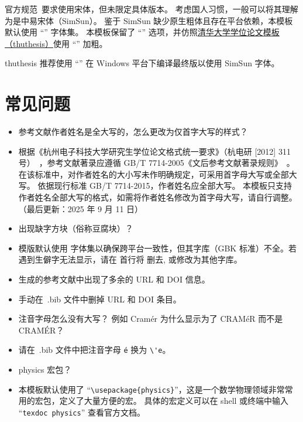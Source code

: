 官方规范~\cite{hdy2012311}要求使用宋体，但未限定具体版本。
考虑国人习惯，一般可以将其理解为是中易宋体（SimSun）。
鉴于 SimSun 缺少原生粗体且存在平台依赖，本模板默认使用 ``'' 字体集。
本模板保留了 ``'' 选项，并仿照\href{https://github.com/tuna/thuthesis}{清华大学学位论文模板（thuthesis）}使用 ``'' 加粗。

thuthesis 推荐使用 ``'' 在 Windows 平台下编译最终版以使用 SimSun 字体。



\section{常见问题}

\begin{itemize}[nosep]
  \item [Q1:] 
    参考文献作者姓名是全大写的，怎么更改为仅首字大写的样式？
  \item [A1:] 
    根据《杭州电子科技大学研究生学位论文格式统一要求》（杭电研 [2012] 311 号）~\cite{hdy2012311}，参考文献著录应遵循 GB/T 7714-2005《文后参考文献著录规则》~\cite{gbt7714-2005}。
    在该标准中，对作者姓名的大小写未作明确规定，可采用首字母大写或全部大写。
    依据现行标准 GB/T 7714-2015，作者姓名应全部大写。
    本模板只支持作者姓名全部大写的格式，如需将作者姓名修改为首字母大写，请自行调整。（最后更新：2025 年 9 月 11 日）

  \smallskip
  \item [Q2:]
    出现缺字方块（俗称豆腐块）？
  \item [A2:]
   模版默认使用  字体集以确保跨平台一致性，但其字库（GBK 标准）不全。若遇到生僻字无法显示，请在  首行将  删去, 或修改为其他字库。


  \smallskip
  \item [Q3:] 
    生成的参考文献中出现了多余的 URL 和 DOI 信息。
  \item [A3:]
    手动在\ .bib 文件中删掉 URL 和 DOI 条目。

  \smallskip
  \item [Q4:]
    注音字母怎么没有大写？
    例如 Cram\'er 为什么显示为了 CRAM\'eR 而不是 CRAM\'ER？
  \item [A4:]
    请在\ .bib 文件中把注音字母 \texttt{\'e} 换为 \verb|\'e|。

  \smallskip
  \item [Q5:]
    physics 宏包？
  \item [A5:] 
    本模板默认使用了 ``\verb|\usepackage{physics}|''，这是一个数学物理领域非常常用的宏包，定义了大量方便的宏。
    具体的宏定义可以在 shell 或终端中输入 ``\verb|texdoc physics|'' 查看官方文档。

\end{itemize}


